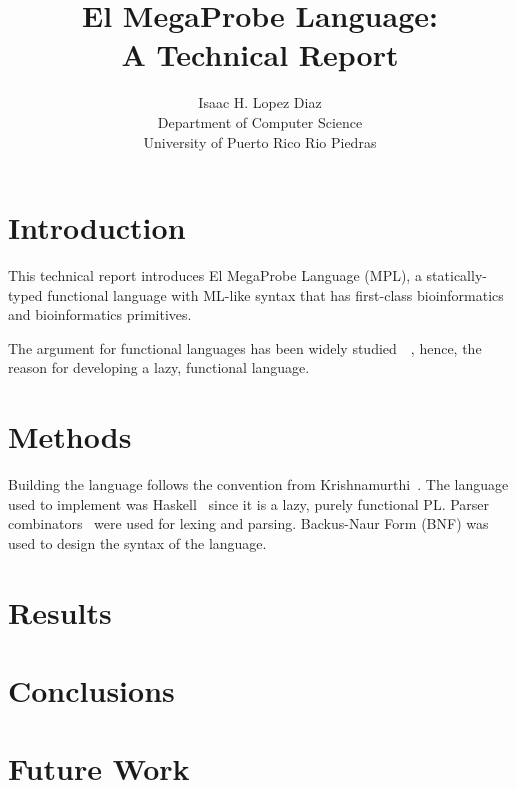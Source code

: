 \documentclass{article}
\title{El MegaProbe Language\@:\\
A Technical Report}
\author{Isaac H. Lopez Diaz\\
Department of Computer Science\\
University of Puerto Rico Rio Piedras}
\begin{document}
\maketitle

\begin{abstract} %
\end{abstract}

\section{Introduction}

This technical report introduces El MegaProbe Language (MPL), a statically-typed
functional language with ML-like syntax that has first-class bioinformatics and 
bioinformatics primitives. 

The argument for functional languages has been widely studied~\cite{whyfp}~\cite{totalfp}, hence,
the reason for developing a lazy, functional language. 

\section{Methods}

Building the language follows the convention from Krishnamurthi~\cite{plai}. 
The language used to implement was Haskell~\cite{haskell} since it is a lazy, purely functional
PL\@. Parser combinators~\cite{parser} were used for lexing and parsing. Backus-Naur Form (BNF)
was used to design the syntax of the language.

\section{Results}

\section{Conclusions}

\section{Future Work}



\end{document}
